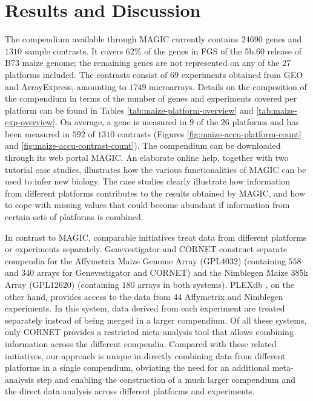 \section{Results and Discussion}

The compendium available through MAGIC currently contains $24690$ genes and $1310$ sample contrasts. It covers $62\%$ of the genes in FGS of the 5b.60 release of B73 maize genome; the remaining genes are not represented on any of the $27$ platforms included. The contrasts consist of $69$ experiments obtained from GEO and ArrayExpress, amounting to $1749$ microarrays. Details on the composition of the compendium in terms of the number of genes and experiments covered per platform can be found in Tables \ref{tab:maize-platform-overview} and \ref{tab:maize-exp-overview}.  On average, a gene is measured in $9$ of the $26$ platforms and has been  measured in $592$ of $1310$ contrasts (Figures \ref{fig:maize-accu-platform-count} and  \ref{fig:maize-accu-contrast-count}).  The compendium can be downloaded through its web portal MAGIC.  An elaborate online help, together with two tutorial case studies, illustrates how the various functionalities of MAGIC can be used to infer new biology.  The case studies clearly illustrate how information from different platforms contributes to the results obtained by MAGIC, and how to cope with missing values that could become abundant if information from certain sets of platforms is combined.

 In contrast to MAGIC, comparable initiatives treat data from different platforms or experiments separately. Genevestigator \cite{Hruz2008} and CORNET \cite{DeBodt2012} construct  separate compendia for the Affymetrix Maize Genome Array (GPL4032) (containing $558$ and $340$ arrays for Genevestigator and CORNET) and the Nimblegen Maize 385k Array (GPL12620) (containing $180$ arrays in both systems). PLEXdb \cite{Dash2011}, on the other hand, provides access to the data from 44 Affymetrix and Nimblegen experiments. In this system, data derived from each experiment are treated separately  instead of being merged in a larger compendium. Of all these systems, only CORNET provides a restricted meta-analysis tool that allows combining information across the different compendia. Compared with these related initiatives, our approach is unique in directly combining data from different platforms in a single compendium, obviating the need for an additional meta-analysis  step \cite{Fierro2008} and enabling the construction of a much larger compendium and the direct data analysis across different platforms and experiments.



\cleardoublepage


